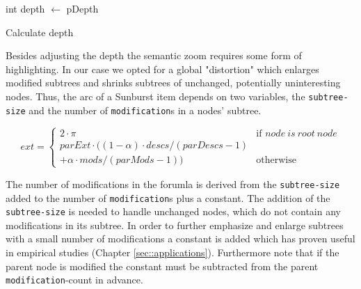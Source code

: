 \begin{algorithm}[tb]
{}
\BlankLine
int depth $\leftarrow$ pDepth\;
\caption{Calculate depth}\label{algo:calcDepth}
\end{algorithm}

Besides adjusting the depth the semantic zoom requires some form of highlighting. In our case we opted for a global "distortion" which enlarges modified subtrees and shrinks subtrees of unchanged, potentially uninteresting nodes. Thus, the arc of a Sunburst item depends on two variables, the \texttt{subtree-size} and the number of \texttt{modification}s in a nodes' subtree.

\begin{equation}
ext = \left\{ \begin{array}{cl}
2 \cdot \pi & \textrm{if }node\ is\ root\ node\\
parExt \cdot ((1-\alpha) \cdot descs / (parDescs - 1) \\+ \alpha \cdot mods / (parMods - 1)) & \textrm{otherwise}\end{array}\right.
\end{equation}

The number of modifications in the forumla is derived from the \texttt{subtree-size} added to the number of \texttt{modification}s plus a constant. The addition of the \texttt{subtree-size} is needed to handle unchanged nodes, which do not contain any modifications in its subtree. In order to further emphasize and enlarge subtrees with a small number of modifications a constant is added which has proven useful in empirical studies (Chapter \ref{sec::applications}). Furthermore note that if the parent node is modified the constant must be subtracted from the parent \texttt{modification}-count in advance.

